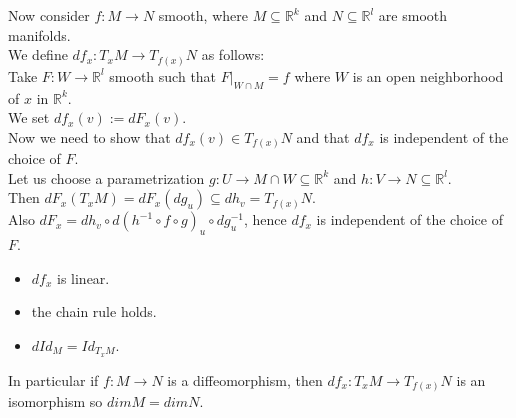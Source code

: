 \begin{definition}\label{4.7}
    Now consider $f:M\to N$ smooth, where $M\subseteq \mathbb{R}^k$ and $N\subseteq \mathbb{R}^l$ are smooth manifolds.\\
    We define $df_x:T_xM\to T_{f(x)}N$ as follows:\\
    Take $F:W\to \mathbb{R}^l$ smooth such that $F|_{W\cap M}=f$ where $W$ is an open neighborhood of $x$ in $\mathbb{R}^k$.\\
    We set $df_x(v):=dF_x(v)$.\\
    Now we need to show that $df_x(v)\in T_{f(x)}N$ and that $df_x$ is independent of the choice of $F$.\\  
    Let us choose a parametrization $g:U\to M\cap W\subseteq \mathbb{R}^k$ and $h:V\to N\subseteq\mathbb{R}^l$.\\
    Then $dF_x(T_xM)=dF_x(dg_u)\subseteq dh_v=T_{f(x)}N$.\\
    Also $dF_x=dh_v\circ d(h^{-1}\circ f\circ g)_u\circ dg_u^{-1}$, hence $df_x$ is independent of the choice of $F$.\\
    \begin{itemize}
        \item $df_x$ is linear.
        \item the chain rule holds.
        \item $dId_M=Id_{T_xM}$.
    \end{itemize}
    In particular if $f:M\to N$ is a diffeomorphism, then $df_x:T_xM\to T_{f(x)}N$ is an isomorphism so $dim M=dim N$.\\
    \begin{center}
\begin{minipage}{0.48\textwidth}
\centering
{}
\end{minipage}
\hfill
\begin{minipage}{0.48\textwidth}
\centering
{}
\end{minipage}
\end{center}
\end{definition}